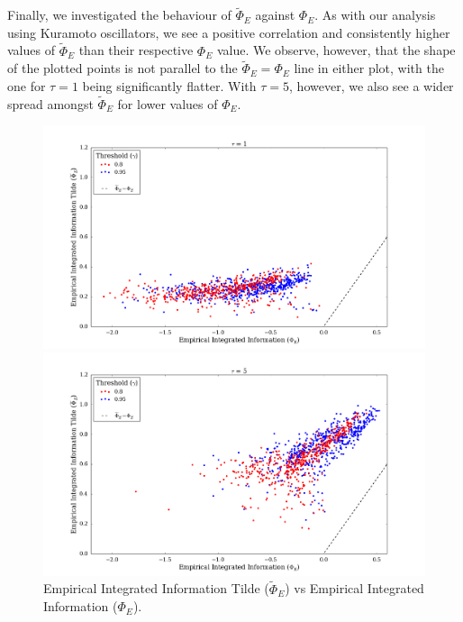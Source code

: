 \documentclass[a4paper,11pt]{article}
\begin{document}
Finally, we investigated the behaviour of $\widetilde{\Phi}_{E}$ against $\Phi_{E}$. As with our analysis using Kuramoto oscillators, we see a positive correlation and consistently higher values of $\widetilde{\Phi}_{E}$ than their respective $\Phi_E$ value.  We observe, however, that the shape of the plotted points is not parallel to the $\widetilde{\Phi}_{E} = \Phi_E$ line in either plot, with the one for $\tau = 1$ being significantly flatter. With $\tau = 5$, however, we also see a wider spread amongst $\widetilde{\Phi}_{E}$ for lower values of $\Phi_E$.

\begin{figure}[H] 
	\begin{minipage}[b]{0.5\linewidth}
		\begin{center}
		\includegraphics[scale = 0.2]{figures/snn/phi_tilde_vs_phi_1}
		\end{center}
		\vspace{4ex}
	\end{minipage}
	\begin{minipage}[b]{0.5\linewidth}
		\begin{center}
		\includegraphics[scale = 0.2]{figures/snn/phi_tilde_vs_phi_5}
		\end{center}
		\vspace{4ex}
	\end{minipage}
	\caption{
		Empirical Integrated Information Tilde ($\widetilde{\Phi}_E$) vs Empirical Integrated Information ($\Phi_E$).
		\label{fig:phi_tilde_vs_phi}
	}
\end{figure}
\end{document}
